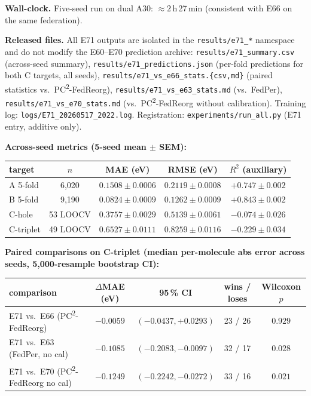 \documentclass[11pt,a4paper]{article}
\newcommand{\PC}{PC\textsuperscript{2}-FedReorg}
\begin{document}
\textbf{Wall-clock.} Five-seed run on dual A30: $\approx 2$\,h\,27\,min (consistent with E66 on the same federation).

\textbf{Released files.} All E71 outputs are isolated in the \texttt{results/e71\_*} namespace and do not modify the E60--E70 prediction archive: \texttt{results/e71\_summary.csv} (across-seed summary), \texttt{results/e71\_predictions.json} (per-fold predictions for both C targets, all seeds), \texttt{results/e71\_vs\_e66\_stats.\{csv,md\}} (paired statistics vs.\ \PC{}), \texttt{results/e71\_vs\_e63\_stats.md} (vs.\ FedPer), \texttt{results/e71\_vs\_e70\_stats.md} (vs.\ \PC{} without calibration). Training log: \texttt{logs/E71\_20260517\_2022.log}. Registration: \texttt{experiments/run\_all.py} (E71 entry, additive only).

\textbf{Across-seed metrics (5-seed mean $\pm$ SEM):}

\begin{table}[h]
\centering
\footnotesize
\setlength{\tabcolsep}{4pt}
\begin{tabular}{lcccc}
\toprule
target & $n$ & MAE (eV) & RMSE (eV) & $R^2$ (auxiliary) \\
\midrule
A 5-fold     & 6{,}020       & $0.1508 \pm 0.0006$ & $0.2119 \pm 0.0008$ & $+0.747 \pm 0.002$ \\
B 5-fold     & 9{,}190       & $0.0824 \pm 0.0009$ & $0.1262 \pm 0.0009$ & $+0.843 \pm 0.002$ \\
C-hole       & 53 LOOCV      & $0.3757 \pm 0.0029$ & $0.5139 \pm 0.0061$ & $-0.074 \pm 0.026$ \\
C-triplet    & 49 LOOCV      & $0.6527 \pm 0.0111$ & $0.8259 \pm 0.0116$ & $-0.229 \pm 0.034$ \\
\bottomrule
\end{tabular}
\end{table}

\textbf{Paired comparisons on C-triplet (median per-molecule abs error across seeds, 5{,}000-resample bootstrap CI):}

\begin{table}[h]
\centering
\footnotesize
\setlength{\tabcolsep}{4pt}
\begin{tabular}{lcccc}
\toprule
comparison & $\Delta$MAE (eV) & 95\,\% CI & wins / loses & Wilcoxon $p$ \\
\midrule
E71 vs.\ E66 (\PC{})            & $-0.0059$ & $(-0.0437, +0.0293)$ & 23 / 26 & $0.929$ \\
E71 vs.\ E63 (FedPer, no cal)   & $-0.1085$ & $(-0.2083, -0.0097)$ & 32 / 17 & $0.028$ \\
E71 vs.\ E70 (\PC{} no cal)     & $-0.1249$ & $(-0.2242, -0.0272)$ & 33 / 16 & $0.021$ \\
\bottomrule
\end{tabular}
\end{table}
\end{document}
